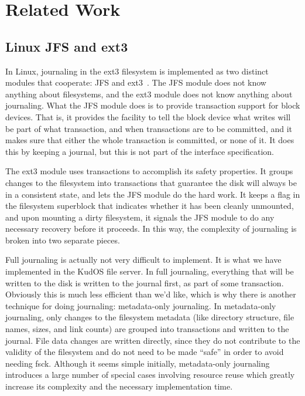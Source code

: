 \section{Related Work}
\label{sec:related}

\subsection{Linux JFS and ext3}

In Linux, journaling in the ext3 filesystem is implemented as two distinct
modules that cooperate: JFS and ext3~\cite{tweedie98journaling}. The JFS module
does not know anything about filesystems, and the ext3 module does not know
anything about journaling. What the JFS module does is to provide transaction
support for block devices. That is, it provides the facility to tell the block
device what writes will be part of what transaction, and when transactions are
to be committed, and it makes sure that either the whole transaction is
committed, or none of it. It does this by keeping a journal, but this is not
part of the interface specification.

The ext3 module uses transactions to accomplish its safety properties. It groups
changes to the filesystem into transactions that guarantee the disk will always
be in a consistent state, and lets the JFS module do the hard work. It keeps a
flag in the filesystem superblock that indicates whether it has been cleanly
unmounted, and upon mounting a dirty filesystem, it signals the JFS module to do
any necessary recovery before it proceeds. In this way, the complexity of
journaling is broken into two separate pieces.

Full journaling is actually not very difficult to implement. It is what we have
implemented in the KudOS file server. In full journaling, everything that will
be written to the disk is written to the journal first, as part of some
transaction. Obviously this is much less efficient than we'd like, which is why
there is another technique for doing journaling: metadata-only journaling. In
metadata-only journaling, only changes to the filesystem metadata (like
directory structure, file names, sizes, and link counts) are grouped into
transactions and written to the journal. File data changes are written directly,
since they do not contribute to the validity of the filesystem and do not need
to be made ``safe'' in order to avoid needing fsck. Although it seems simple
initially, metadata-only journaling introduces a large number of special cases
involving resource reuse which greatly increase its complexity and the necessary
implementation time.

